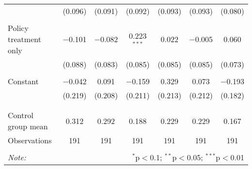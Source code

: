 \begin{tabular}{@{\extracolsep{5pt}}lcccccc}
  & (0.096) & (0.091) & (0.092) & (0.093) & (0.093) & (0.080) \\ 
  & & & & & & \\ 
 Policy treatment only & $-$0.101 & $-$0.082 & 0.223$^{***}$ & 0.022 & $-$0.005 & 0.060 \\ 
  & (0.088) & (0.083) & (0.085) & (0.085) & (0.085) & (0.073) \\ 
  & & & & & & \\ 
 Constant & $-$0.042 & 0.091 & $-$0.159 & 0.329 & 0.073 & $-$0.193 \\ 
  & (0.219) & (0.208) & (0.211) & (0.213) & (0.212) & (0.182) \\ 
  & & & & & & \\ 
\hline \\[-1.8ex] 
Control group mean & 0.312 & 0.292 & 0.188 & 0.229 & 0.229 & 0.167 \\ 
Observations & 191 & 191 & 191 & 191 & 191 & 191 \\ 
\hline 
\hline \\[-1.8ex] 
\textit{Note:}  & \multicolumn{6}{r}{$^{*}$p$<$0.1; $^{**}$p$<$0.05; $^{***}$p$<$0.01} \\ 
\end{tabular} 
